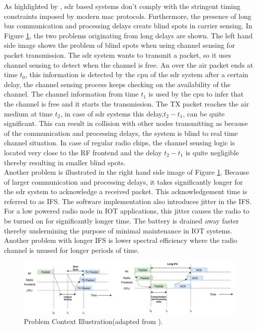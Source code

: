 As highlighted by \cite{schmid_experimental_2007}, \ac{sdr} based systems don't comply with the stringent timing constraints imposed by modern \ac{mac} protocols. Furthermore, the presence of long bus communication and processing delays create blind spots\cite{schmid_experimental_2007} in carrier sensing. 
In Figure \ref{blind_spots}, the two problems originating from long delays are shown.
The left hand side image shows the problem of blind spots when using channel sensing for packet transmission.
The \ac{sdr} system wants to transmit a packet, so it uses channel sensing to detect when the channel is free.
An over the air packet ends at time $t_0$, this information is detected by the \ac{cpu} of the \ac{sdr} system after a certain delay, the channel sensing process keeps checking on the availability of the channel.
The channel information from time $t_1$ is used by the \ac{cpu} to infer that the channel is free and it starts the transmission.
The TX packet reaches the air medium at time $t_2$, in case of \ac{sdr} systems this delay,$t_2-t_1$, can be quite significant.
This can result in collision with other nodes transmitting as because of the communication and processing delays, the system is blind to real time channel situation.
In case of regular radio chips, the channel sensing logic is located very close to the \ac{RF} frontend and the delay $t_2 - t_1$ is quite negligible thereby resulting in smaller blind spots.\\

Another problem is illustrated in the right hand side image of Figure \ref{blind_spots}.
Because of larger communication and processing delays, it takes significantly longer for the \ac{sdr} system to acknowledge a received packet.
This acknowledgement time is referred to as \ac{IFS}.
The software implementation also introduces jitter in the {IFS}.
For a low powered radio node in \ac{IOT} applications, this jitter causes the radio to be turned on for significantly longer time.
The battery is drained away faster thereby undermining the purpose of minimal maintenance in \ac{IOT} systems.
Another problem with longer \ac{IFS} is lower spectral efficiency where the radio channel is unused for longer periods of time.\\ 

\begin{figure}[!h]
\centering
\includegraphics[width=\textwidth]{Figure/BlindSpots.png}
\caption{Problem Context Illustration(adapted from \cite{schmid_experimental_2007}).}
\label{blind_spots}
\end{figure}

